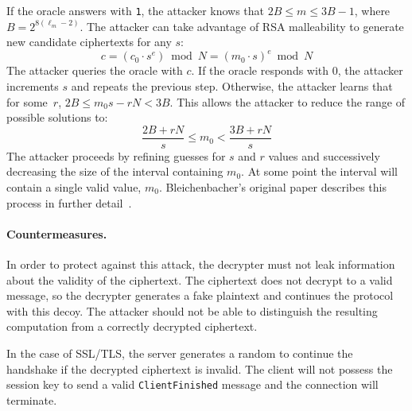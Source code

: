If the oracle answers with \texttt{1}, the attacker knows that $2B
\leq m \leq 3B-1$, where $B = 2^{8(\ell_m-2)}$.  The attacker can
take advantage of RSA malleability to generate new candidate ciphertexts
for any $s$:
\[
c = (c_{0} \cdot s^e) \bmod N = (m_{0} \cdot s)^e \bmod N 
\]
The attacker queries the oracle with $c$. If the oracle responds with
$0$, the attacker increments $s$ and repeats the previous
step. Otherwise, the attacker learns that for some~$r$, $2B \leq m_{0}s - rN  < 3B$. This allows the attacker to reduce the range of possible solutions to:  
\[ 
\frac{2B+rN}{s} \leq m_{0} < \frac{3B+rN}{s}  
\] 
The attacker proceeds by refining guesses for $s$ and $r$ values and
successively decreasing the size of the interval containing $m_{0}$.  At
some point the interval will contain a single valid value, $m_{0}$.
Bleichenbacher's original paper describes this process in further
detail~\cite{Bleichenbacher}.

\paragraph{Countermeasures.}
In order to protect against this attack, the decrypter must not leak
information about the \PKCS validity of the ciphertext.  The
ciphertext does not decrypt to a valid message, so the
decrypter generates a fake plaintext and continues the
protocol with this decoy.  The attacker should not be able to
distinguish the resulting computation from a correctly decrypted
ciphertext.

In the case of SSL/TLS, the server generates a random \pms to continue
the handshake if the decrypted ciphertext is
invalid.  The client will not possess the session key to send a valid
\texttt{ClientFinished} message and the connection will terminate.

